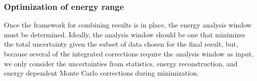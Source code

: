 \subsubsection{Optimization of energy range} \label{ssec:enRange} %

Once the framework for combining results is in place, the energy analysis window must be determined.
Ideally, the analysis window should be one that minimizes the total uncertainty given the subset of data chosen
for the final result, but, because several of the integrated corrections require the analysis window
as input, we only consider the uncertainties from statistics, energy reconstruction,
and energy dependent Monte Carlo corrections during minimization.

\begin{figure}[p]
  \centering
   \\
   \\

\end{figure}
